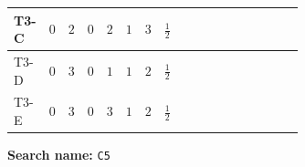 \documentclass[8pt]{article}
\begin{document}
\begin{landscape}
\begin{longtable}{@{}llcccccc >{\raggedright\arraybackslash}p{0.21\linewidth} >{\raggedright\arraybackslash}p{0.21\linewidth} >{\raggedright\arraybackslash}p{0.21\linewidth}@{}}
\midrule
T3-C & $0$ & $2$ & $0$ & $2$ & $1$ & $3$ & $\frac{1}{2}$ & \scriptsize\adjustbox{max width=\linewidth}{$\begin{gathered} - 3 C_{5} g_{2}^{2}\end{gathered}$} & \scriptsize\adjustbox{max width=\linewidth}{$\begin{gathered} 2 C_{5} \lambda_H\end{gathered}$} & \scriptsize\adjustbox{max width=\linewidth}{$\begin{gathered} - C_{5} Y_e Y_e^\dagger\end{gathered}$} \\
\midrule
T3-D & $0$ & $3$ & $0$ & $1$ & $1$ & $2$ & $\frac{1}{2}$ & \scriptsize\adjustbox{max width=\linewidth}{$\begin{gathered} - 3 C_{5} g_{2}^{2}\end{gathered}$} & \scriptsize\adjustbox{max width=\linewidth}{$\begin{gathered} 2 C_{5} \lambda_H\end{gathered}$} & \scriptsize\adjustbox{max width=\linewidth}{$\begin{gathered} - C_{5} Y_e Y_e^\dagger\end{gathered}$} \\
\midrule
T3-E & $0$ & $3$ & $0$ & $3$ & $1$ & $2$ & $\frac{1}{2}$ & \scriptsize\adjustbox{max width=\linewidth}{$\begin{gathered} - 3 C_{5} g_{2}^{2}\end{gathered}$} & \scriptsize\adjustbox{max width=\linewidth}{$\begin{gathered} 2 C_{5} \lambda_H\end{gathered}$} & \scriptsize\adjustbox{max width=\linewidth}{$\begin{gathered} - C_{5} Y_e Y_e^\dagger\end{gathered}$} \\
\midrule
\bottomrule
\end{longtable}
\clearpage
\noindent\textbf{Search name: }\texttt{C5}\par\smallskip

\end{landscape}
\end{document}
